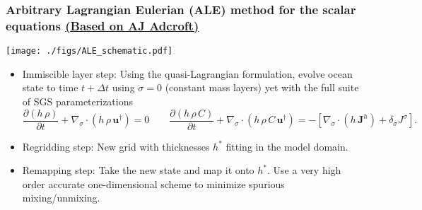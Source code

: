 \documentclass[10pt]{beamer}
\begin{document}
\begin{frame}
  \frametitle{Arbitrary Lagrangian Eulerian (ALE) method for the scalar equations \small  
\href{https://adcroft.github.io/2017/03/01/MOM6-ALE-algorithm.html}{(Based on AJ Adcroft)} }

\vspace{-.3cm} 


\begin{center}
{\texttt{[image: ./figs/ALE\_schematic.pdf]}}
\end{center}


\begin{exampleblock}{}
\begin{itemize}

\item {\sc Immiscible layer step:} Using the quasi-Lagrangian
  formulation, evolve ocean state to time $t + \Delta t$ using
  $\dot{\sigma} = 0$ (constant mass layers) yet with the full suite of
  SGS parameterizations
\begin{equation*}
\frac{\partial (h \, \rho)}{\partial  t} + \nabla_{\sigma} \cdot (h \, \rho \, {\bm u}^{\dagger} ) = 0 
\qquad 
 \frac{\partial (h \, \rho \, C)}{\partial  t} + \nabla_{\sigma} \cdot (h \, \rho \, C \, {\bm u}^{\dagger} ) 
 =
 -\left[  \nabla_{\sigma} \cdot ( h \, {\bm J}^{h}) +  \delta_{\sigma} J^{\sigma} \right]. 
\label{eq:gvc-mass-tracer-equation-ALE-stepA}
\end{equation*}


\item {\sc Regridding step:} New grid with thicknesses $h^{*}$ fitting
  in the model domain.

\item {\sc Remapping step:} Take the new state and map it onto $h^*$.
  Use a very high order accurate one-dimensional scheme to minimize
  spurious mixing/unmixing.

\end{itemize}
\end{exampleblock}{}

\end{frame}
\end{document}

